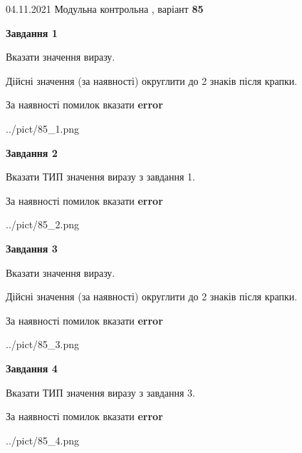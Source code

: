 \documentclass[11pt, ukrainian]{article}
\begin{document}
{04.11.2021 Модульна контрольна , варіант  \No \textbf { 85 }\par}
{
\begin {large}
{\begin {center}\textbf{Завдання 1}\end {center}}\par
Вказати значення виразу. \par
Дійсні значення (за наявності) округлити до 2 знаків після крапки. \par
За наявності помилок вказати \textbf{error}

\begin{center}
	{../pict/85_1.png}
\end{center}
\newpage

{\begin {center}\textbf{Завдання 2}\end {center}}\par
Вказати ТИП значення виразу з завдання 1. \par
За наявності помилок вказати \textbf{error}

\begin{center}
	{../pict/85_2.png}
\end{center}
\newpage

{\begin {center}\textbf{Завдання 3}\end {center}}\par
Вказати значення виразу. \par
Дійсні значення (за наявності) округлити до 2 знаків після крапки. \par
За наявності помилок вказати \textbf{error}

\begin{center}
	{../pict/85_3.png}
\end{center}
\newpage

{\begin {center}\textbf{Завдання 4}\end {center}}\par
Вказати ТИП значення виразу з завдання 3. \par
За наявності помилок вказати \textbf{error}

\begin{center}
	{../pict/85_4.png}
\end{center}
\newpage


\end{large}}
\end{document}
